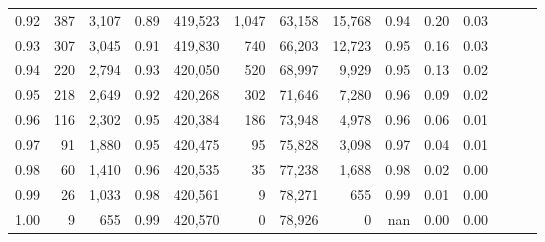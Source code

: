 \begin{tabular}{rrrrrrrrrrrrrr}
0.92 &    387 &  3,107 &  0.89 &  419,523 &    1,047 &  63,158 &  15,768 &  0.94 &  0.20 &      0.03 \\
0.93 &    307 &  3,045 &  0.91 &  419,830 &      740 &  66,203 &  12,723 &  0.95 &  0.16 &      0.03 \\
0.94 &    220 &  2,794 &  0.93 &  420,050 &      520 &  68,997 &   9,929 &  0.95 &  0.13 &      0.02 \\
0.95 &    218 &  2,649 &  0.92 &  420,268 &      302 &  71,646 &   7,280 &  0.96 &  0.09 &      0.02 \\
0.96 &    116 &  2,302 &  0.95 &  420,384 &      186 &  73,948 &   4,978 &  0.96 &  0.06 &      0.01 \\
0.97 &     91 &  1,880 &  0.95 &  420,475 &       95 &  75,828 &   3,098 &  0.97 &  0.04 &      0.01 \\
0.98 &     60 &  1,410 &  0.96 &  420,535 &       35 &  77,238 &   1,688 &  0.98 &  0.02 &      0.00 \\
0.99 &     26 &  1,033 &  0.98 &  420,561 &        9 &  78,271 &     655 &  0.99 &  0.01 &      0.00 \\
1.00 &      9 &    655 &  0.99 &  420,570 &        0 &  78,926 &       0 &   nan &  0.00 &      0.00 \\
\bottomrule
\end{tabular}
